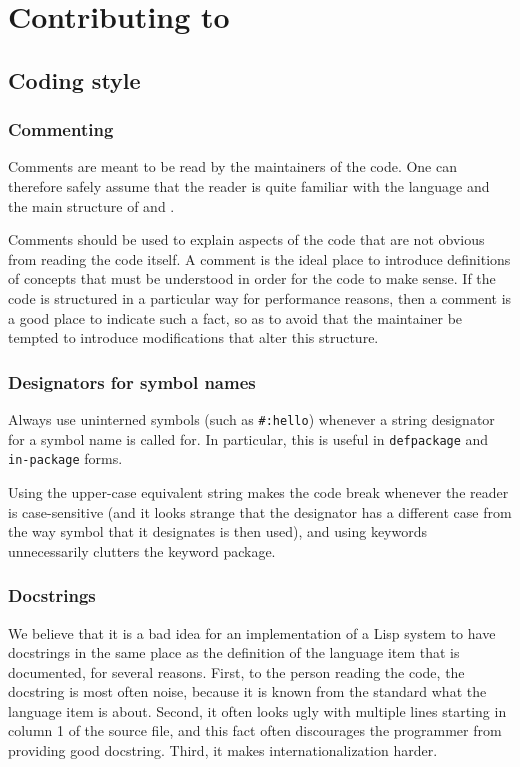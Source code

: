 \chapter{Contributing to \sysname{}}

\section{Coding style}

\subsection{Commenting}

Comments are meant to be read by the maintainers of the code.  One can
therefore safely assume that the reader is quite familiar with the
\cl{} language and the main structure of \clim{} and \sysname{}.

Comments should be used to explain aspects of the code that are not
obvious from reading the code itself.  A comment is the ideal place to
introduce definitions of concepts that must be understood in order for
the code to make sense.  If the code is structured in a particular way
for performance reasons, then a comment is a good place to indicate
such a fact, so as to avoid that the maintainer be tempted to
introduce modifications that alter this structure. 

\subsection{Designators for symbol names}

Always use uninterned symbols (such as \texttt{\#:hello}) whenever a
string designator for a symbol name is called for.  In particular,
this is useful in \texttt{defpackage} and \texttt{in-package} forms.

Using the upper-case equivalent string makes the code break whenever
the reader is case-sensitive (and it looks strange that the designator
has a different case from the way symbol that it designates is then
used), and using keywords unnecessarily clutters the keyword package.

\subsection{Docstrings}

We believe that it is a bad idea for an implementation of a Lisp
system to have docstrings in the same place as the definition of the
language item that is documented, for several reasons.  First, to the
person reading the code, the docstring is most often noise, because it
is known from the standard what the language item is about.  Second,
it often looks ugly with multiple lines starting in column 1 of the
source file, and this fact often discourages the programmer from
providing good docstring.  Third, it makes internationalization
harder.

